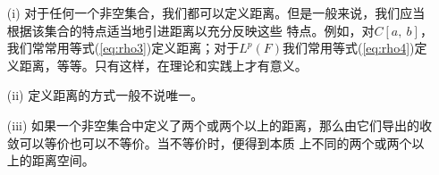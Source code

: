 \begin{note}
	\begin{itemize}
		\item [(i)] 对于任何一个非空集合，我们都可以定义距离。但是一般来说，我们应当根据该集合的特点适当地引进距离以充分反映这些
		      特点。例如，对$C[a,\ b]$，我们常常用等式(\ref{eq:rho3})定义距离；对于$L^p(F)$我们常用等式(\ref{eq:rho4})定义距离，等等。只有这样，在理论和实践上才有意义。
		\item [(ii)] 定义距离的方式一般不说唯一。
		\item [(iii)] 如果一个非空集合中定义了两个或两个以上的距离，那么由它们导出的收敛可以等价也可以不等价。当不等价时，便得到本质
		      上不同的两个或两个以上的距离空间。
	\end{itemize}
\end{note}
